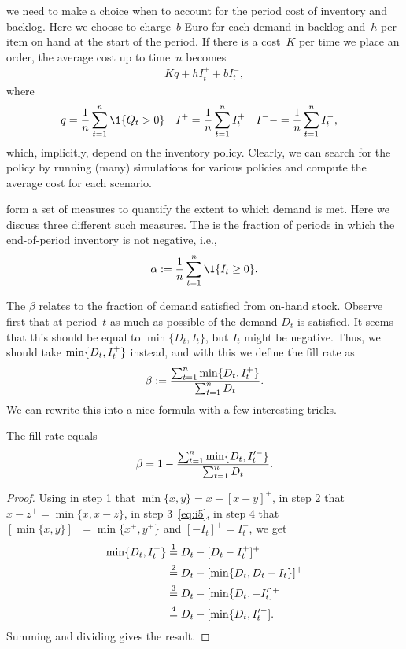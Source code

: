 \documentclass[queueing-book.tex]{subfiles}
\begin{document}
 we need to make a choice when to account for the period cost of inventory and backlog.
Here we choose to charge~$b$ Euro for each demand in backlog  and~$h$ per item on hand at the start of the period.
If there is a cost~$K$ per time we place an order, the average cost up to time~$n$ becomes
\begin{align*}
K q + h I_t^+ + b I_t^-,
\end{align*}
where
\begin{align*}
  q&= \frac 1n \sum_{t=1}^n \1{Q_{t}>0}  &
  I^+ &= \frac 1n \sum_{t=1}^n \IL_t^+  &
  I^-- &= \frac 1n \sum_{t=1}^n \IL_t^-,
\end{align*}
which, implicitly, depend on the inventory policy. Clearly, we can search for the policy by running (many) simulations for various policies and compute the average cost for each scenario.

 form a set of  measures to quantify the extent to which demand is met. Here we discuss three different such measures.
The  is the fraction of periods in which the end-of-period inventory is not negative, i.e.,
\begin{equation*}
\alpha :=   \frac 1n \sum_{t=1}^n \1{\IL_t \geq 0}.
\end{equation*}

The  $\beta$ relates to the fraction of demand satisfied from on-hand stock.
Observe first that at period~$t$ as much as possible of the demand $D_{t}$ is satisfied.
It seems that this should be equal to $\min\{D_{t}, I_{t}\}$, but $I_{t}$ might be negative.
Thus, we should take $\min\{D_{t}, I_{t}^{+}\}$ instead, and with this we define the fill rate as
\begin{equation}\label{eq:c24}
    \beta :=  \frac{\sum_{t=1}^n \min\{D_t, I_t^{+}\}}{\sum_{t=1}^n D_t}.
\end{equation}
We can rewrite this into  a nice formula with a few interesting tricks.

\begin{lemma}\label{lem:4}
The fill rate equals
\begin{equation*}
    \beta = 1 - \frac{\sum_{t=1}^n \min\{D_t, I_t'^-\}}{\sum_{t=1}^n D_t}.
\end{equation*}
\end{lemma}
\begin{proof}
Using in step 1 that $\min\{x, y\} = x - [x-y]^{+}$, in step 2 that  $x - z^{+} = \min\{x, x-z\}$, in step 3~\cref{eq:i5}, in step 4 that $[\min\{x, y\}]^{+} = \min\{x^+, y^{+}\}$ and $[-I_t]^{+} = I_t^{-}$, we get
\begin{align*}
   \min\{D_{t}, I_{t}^{+}\}
  &\stackrel1= D_t - [D_t-I_{t}^{+}]^{+}\\
  &\stackrel2= D_t - [\min\{D_t, D_{t}-I_{t}\}]^{+}\\
  &\stackrel3= D_t - [\min\{D_t, -I_{t}']^{+}\\
  &\stackrel4= D_t - [\min\{D_t, I_{t}'^{-}].
\end{align*}
Summing and dividing gives the result.
\end{proof}
\end{document}
